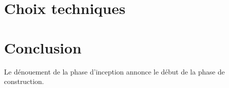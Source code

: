 \begin{spacing}{1.5}
\section{Choix techniques}


\section*{Conclusion}
Le dénouement de la phase d'inception annonce le début de la phase de construction.

\end{spacing}
